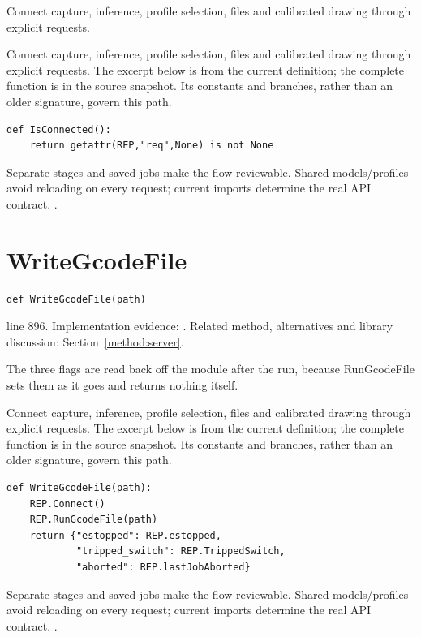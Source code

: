 Connect capture, inference, profile selection, files and calibrated drawing through explicit requests.


Connect capture, inference, profile selection, files and calibrated drawing through explicit requests. The excerpt below is from the current definition; the complete function is in the source snapshot. Its constants and branches, rather than an older signature, govern this path.


\begin{lstlisting}[style=plain]
def IsConnected():
    return getattr(REP,"req",None) is not None
\end{lstlisting}
Separate stages and saved jobs make the flow reviewable. Shared models/profiles avoid reloading on every request; current imports determine the real API contract. \cite{flaskdocs,pillowops,code2026}.


\section{WriteGcodeFile}\label{fn:web-server:WriteGcodeFile}
\begin{lstlisting}[style=sig]
def WriteGcodeFile(path)
\end{lstlisting}
 line 896. Implementation evidence: \cite{code2026}. Related method, alternatives and library discussion: Section~\ref{method:server}.


The three flags are read back off the module after the run, because RunGcodeFile sets them as it goes and returns nothing itself.


Connect capture, inference, profile selection, files and calibrated drawing through explicit requests. The excerpt below is from the current definition; the complete function is in the source snapshot. Its constants and branches, rather than an older signature, govern this path.


\begin{lstlisting}[style=plain]
def WriteGcodeFile(path):
    REP.Connect()
    REP.RunGcodeFile(path)
    return {"estopped": REP.estopped,
            "tripped_switch": REP.TrippedSwitch,
            "aborted": REP.lastJobAborted}
\end{lstlisting}
Separate stages and saved jobs make the flow reviewable. Shared models/profiles avoid reloading on every request; current imports determine the real API contract. \cite{flaskdocs,pillowops,code2026}.


